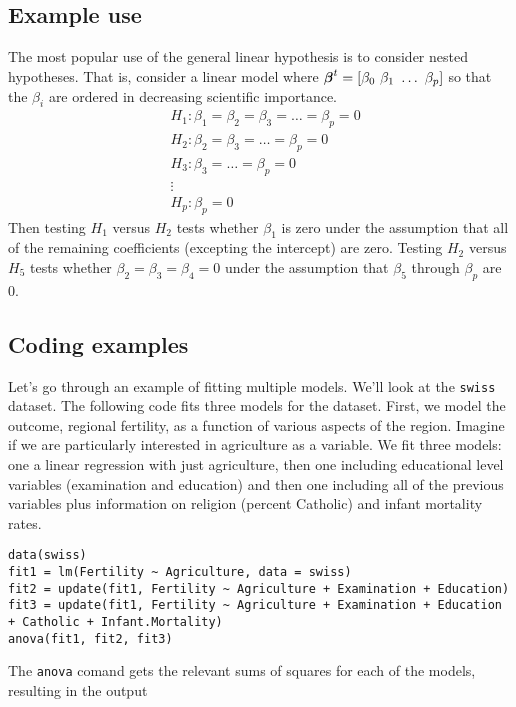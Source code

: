\subsection{Example use}
The most popular use of the general linear hypothesis is to consider nested hypotheses. 
That is, consider a linear model where $\boldsymbol{\beta}^t = [\beta_0 ~ \beta_1 ~ \ldots ~\beta_p]$
so that the $\beta_i$ are ordered in decreasing scientific importance.
\begin{align*}
 & H_1 : \beta_1  = \beta_2  = \beta_3 = \ldots = \beta_p = 0 \\
 & H_2 :            \beta_2  = \beta_3 = \ldots = \beta_p = 0 \\
 & H_3 :                       \beta_3 = \ldots = \beta_p = 0 \\
 & \vdots \\
 & H_p : \beta_p = 0
\end{align*}
Then testing $H_1$ versus $H_2$ tests whether $\beta_1$ is zero under the assumption
that all of the remaining coefficients (excepting the intercept) are zero. 
Testing $H_2$ versus $H_5$ tests whether $\beta_2 = \beta_3 = \beta_4 = 0$
under the assumption that $\beta_5$ through $\beta_p$ are 0. 

\subsection{Coding examples}
Let's go through an example of fitting multiple models. We'll look
at the \texttt{swiss} dataset.  The following code fits three models
for the dataset. First, we model the outcome, regional fertility,
as a function of various aspects of the region. Imagine if we
are particularly interested in agriculture as a variable. We
fit three models: one a linear regression with just agriculture,
then one including educational level variables (examination and education) and
then one including all of the previous variables plus information on religion (percent Catholic)
and infant mortality rates.

\begin{verbatim}
data(swiss)
fit1 = lm(Fertility ~ Agriculture, data = swiss)
fit2 = update(fit1, Fertility ~ Agriculture + Examination + Education)
fit3 = update(fit1, Fertility ~ Agriculture + Examination + Education + Catholic + Infant.Mortality)
anova(fit1, fit2, fit3)
\end{verbatim}

The \texttt{anova} comand gets the relevant sums of squares for each of the models, resulting in the
output

